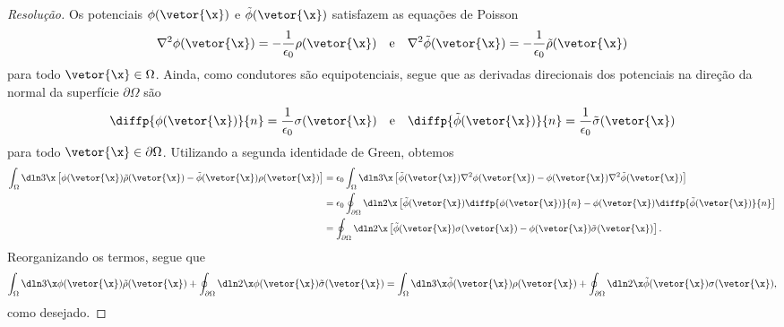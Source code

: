 \begin{proof}[Resolução]
    Os potenciais \(\phi(\vetor{\x})\) e \(\tilde{\phi}(\vetor{\x})\) satisfazem as equações de Poisson
    \begin{equation*}
        \nabla^2 \phi(\vetor{\x}) =-\frac{1}{\epsilon_0}\rho(\vetor{\x})
        \quad\text{e}\quad
        \nabla^2 \tilde{\phi}(\vetor{\x}) =-\frac{1}{\epsilon_0}\tilde{\rho}(\vetor{\x})
    \end{equation*}
    para todo \(\vetor{\x} \in \Omega\). Ainda, como condutores são equipotenciais, segue que as derivadas direcionais dos potenciais na direção da normal da superfície \(\partial \Omega\) são
    \begin{equation*}
        \diffp{\phi(\vetor{\x})}{n} = \frac{1}{\epsilon_0}\sigma(\vetor{\x})
        \quad\text{e}\quad
        \diffp{\tilde{\phi}(\vetor{\x})}{n} = \frac{1}{\epsilon_0}\tilde{\sigma}(\vetor{\x})
    \end{equation*}
    para todo \(\vetor{\x} \in \partial \Omega\). Utilizando a segunda identidade de Green, obtemos
    \begin{align*}
        \int_{\Omega} \dln3\x \left[\phi(\vetor{\x})\tilde{\rho}(\vetor{\x}) - \tilde{\phi}(\vetor{\x})\rho(\vetor{\x})\right]
        &= \epsilon_0\int_{\Omega} \dln3\x \left[\tilde{\phi}(\vetor{\x})\nabla^2\phi(\vetor{\x})-\phi(\vetor{\x})\nabla^2\tilde{\phi}(\vetor{\x})\right]\\
        &= \epsilon_0 \oint_{\partial \Omega}\dln2\x \left[\tilde{\phi}(\vetor{\x})\diffp{\phi(\vetor{\x})}{n} - \phi(\vetor{\x}) \diffp{\tilde{\phi}(\vetor{\x})}{n} \right]\\
        &= \oint_{\partial \Omega} \dln2\x \left[\tilde{\phi}(\vetor{\x}) \sigma(\vetor{\x}) - \phi(\vetor{\x}) \tilde{\sigma}(\vetor{\x})\right].
    \end{align*}
    Reorganizando os termos, segue que
    \begin{equation*}
        \int_{\Omega}\dln3\x \phi(\vetor{\x}) \tilde{\rho}(\vetor{\x}) + \oint_{\partial \Omega}\dln2\x \phi(\vetor{\x})\tilde{\sigma}(\vetor{\x}) = \int_{\Omega}\dln3\x \tilde{\phi}(\vetor{\x})\rho(\vetor{\x}) + \oint_{\partial \Omega} \dln2\x \tilde{\phi}(\vetor{\x})\sigma(\vetor{\x}),
    \end{equation*}
    como desejado.
\end{proof}
